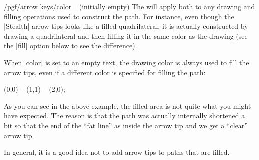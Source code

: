 \begin{key}{/pgf/arrow keys/color= (initially
    \normalfont empty)}
  The  will apply both to any drawing and filling
  operations used to construct the path. For instance, even though the
  |Stealth| arrow tips looks like a filled quadrilateral, it is
  actually constructed by drawing a quadrilateral and then filling it
  in the same color as the drawing (see the |fill| option below to
  see the difference).

  When |color| is set to an empty text, the drawing color is
  always used to fill the arrow tips, even if a different color is
  specified for filling the path: 
\begin{codeexample}[width=3cm]
 \draw [draw=red, fill=red!50, arrows = {-Stealth[length=10pt]}]
                          (0,0) -- (1,1) -- (2,0);
\end{codeexample}
  As you can see in the above example, the filled area is not quite
  what you might have expected. The reason is that the path was
  actually internally shortened a bit so that the end of the ``fat
  line'' as inside the arrow tip and we get a ``clear'' arrow tip.

  In general, it is a good idea not to add arrow tips to paths that
  are filled.
\end{key}

